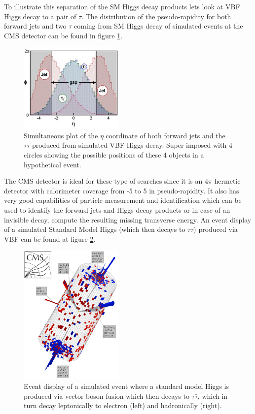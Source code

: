 \documentclass[%
reprint,
amsmath,
amssymb,
aps,
pra,
showkeys
]{revtex4-1}
\begin{document}
To illustrate this separation of the SM Higgs decay products lets look at VBF Higgs decay to a pair of $\tau$.
The distribution of the pseudo-rapidity for both forward jets and two $\tau$ coming from SM Higgs decay of simulated 
events at the CMS detector can be found in figure \ref{figure_VBF_HToTauTau_ObjectsRapidityGap}.

\begin{figure}[ht]
\centering
\includegraphics[width=0.45\textwidth]{img/ObjectsRapidityGap.jpeg}
\caption{Simultaneous plot of the $\eta$ coordinate of both forward jets and the $\tau\bar{\tau}$
produced from simulated VBF Higgs decay. Super-imposed with 4 circles showing the possible positions of these 4
objects in a hypothetical event.}
\label{figure_VBF_HToTauTau_ObjectsRapidityGap}
\end{figure}

The CMS detector is ideal for these type of searches since it is an $4\pi$ hermetic detector with calorimeter coverage
from -5 to 5 in pseudo-rapidity. It also has very good capabilities of particle measurement and identification which 
can be used to identify the forward jets and Higgs decay products or in case of an invisible decay, compute the 
resulting missing transverse energy. An event display of a simulated Standard Model Higgs (which then decays to 
$\tau\bar{\tau}$) produced via VBF can be found at figure \ref{figure_EventDisplay_VBF_HToTauTau_El-Had}.

\begin{figure}[ht]
\centering
\includegraphics[width=0.45\textwidth]{img/EventDisplay_VBF_HToTauTau_El-Had.png}
\caption{Event display of a simulated event where a standard model Higgs is produced via vector boson fusion
which then decays to $\tau\bar{\tau}$, which in turn decay leptonically to electron (left) and hadronically (right).}
\label{figure_EventDisplay_VBF_HToTauTau_El-Had}
\end{figure}
\end{document}
